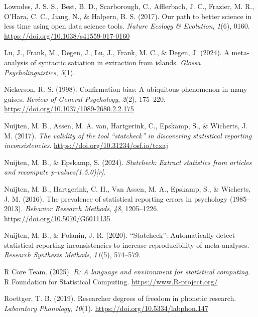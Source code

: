 \documentclass[
  doc,
  longtable,
  nolmodern,
  notxfonts,
  notimes,
  colorlinks=true,linkcolor=blue,citecolor=blue,urlcolor=blue]{apa7}
\newlength{\cslhangindent}
\newenvironment{CSLReferences}[2] %
 {\begin{list}{}{%
  \setlength{\itemindent}{0pt}
  \setlength{\leftmargin}{0pt}
  \setlength{\parsep}{0pt}
  \ifodd #1
   \setlength{\leftmargin}{\cslhangindent}
   \setlength{\itemindent}{-1\cslhangindent}
  \fi
  \setlength{\itemsep}{#2\baselineskip}}}
 {\end{list}}
\begin{document}
\begin{CSLReferences}{1}{0}
Lowndes, J. S. S., Best, B. D., Scarborough, C., Afflerbach, J. C.,
Frazier, M. R., O'Hara, C. C., Jiang, N., \& Halpern, B. S. (2017). Our
path to better science in less time using open data science tools.
\emph{Nature Ecology \& Evolution}, \emph{1}(6), 0160.
\url{https://doi.org/10.1038/s41559-017-0160}

Lu, J., Frank, M., Degen, J., Lu, J., Frank, M. C., \& Degen, J. (2024).
A meta-analysis of syntactic satiation in extraction from islands.
\emph{Glossa Psycholinguistics}, \emph{3}(1).

Nickerson, R. S. (1998). Confirmation bias: A ubiquitous phenomenon in
many guises. \emph{Review of General Psychology}, \emph{2}(2), 175--220.
\url{https://doi.org/10.1037/1089-2680.2.2.175}

Nuijten, M. B., Assen, M. A. van, Hartgerink, C., Epskamp, S., \&
Wicherts, J. M. (2017). \emph{The validity of the tool {``statcheck''}
in discovering statistical reporting inconsistencies}.
\url{https://doi.org/10.31234/osf.io/tcxaj}

Nuijten, M. B., \& Epskamp, S. (2024). \emph{Statcheck: Extract
statistics from articles and recompute p-values(1.5.0){[}r{]}}.

Nuijten, M. B., Hartgerink, C. H., Van Assen, M. A., Epskamp, S., \&
Wicherts, J. M. (2016). The prevalence of statistical reporting errors
in psychology (1985--2013). \emph{Behavior Research Methods}, \emph{48},
1205--1226. \url{https://doi.org/10.5070/G6011135}

Nuijten, M. B., \& Polanin, J. R. (2020). {``Statcheck''}: Automatically
detect statistical reporting inconsistencies to increase reproducibility
of meta-analyses. \emph{Research Synthesis Methods}, \emph{11}(5),
574--579.

R Core Team. (2025). \emph{R: A language and environment for statistical
computing}. R Foundation for Statistical Computing.
\url{https://www.R-project.org/}

Roettger, T. B. (2019). Researcher degrees of freedom in phonetic
research. \emph{Laboratory Phonology}, \emph{10}(1).
\url{https://doi.org/10.5334/labphon.147}


\end{CSLReferences}
\end{document}
